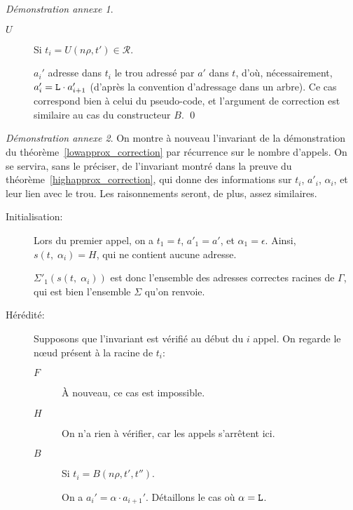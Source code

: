 \documentclass[11pt,a4paper]{article}
\theoremstyle{plain}
\theoremstyle{definition}
\theoremstyle{remark}
\newtheorem{demonstrationappendix}{Démonstration annexe}
\newcommand*{\sequent}{\Gamma}
\newcommand*{\Left}{\textnormal{\texttt{L}}}
\newcommand*{\representations}{\ensuremath{\mathcal{R}}}
\newcommand*{\highapproxspec}{\ensuremath{\Sigma'_1}}
\newcommand*{\treesimplify}{\ensuremath{s}}
\begin{document}
\begin{demonstrationappendix}
\begin{description}
\begin{description}
            \item[$U$] Si $t_i = U(n\rho, t') \in \representations$.
    
            $a_i'$ adresse dans $t_i$ le trou adressé par $a'$ dans $t$, d'où, nécessairement, $a_i' = \Left \cdot a_{i+1}'$ (d'après la convention d'adressage dans un arbre). Ce cas correspond bien à celui du pseudo-code, et l'argument de correction est similaire au cas du constructeur $B$.
\qed
        \end{description}
    \end{description}
\end{demonstrationappendix}

\begin{demonstrationappendix}
    \label{lowapprox_correction_proof}
    On montre à nouveau l'invariant de la démonstration du théorème~\ref{lowapprox_correction} par récurrence sur le nombre d'appels. On se servira, sans le préciser, de l'invariant montré dans la preuve du théorème~\ref{highapprox_correction}, qui donne des informations sur $t_i$, $a'_i$, $\alpha_i$, et leur lien avec le trou. Les raisonnements seront, de plus, assez similaires.

    \begin{description}
        \item[Initialisation:] Lors du premier appel, on a $t_1 = t$, $a'_1 = a'$, et $\alpha_1 = \epsilon$. Ainsi, $\treesimplify( t, \; {\alpha}_i ) = H$, qui ne contient aucune adresse.
        
        $\highapproxspec \left( \treesimplify( t, \; {\alpha}_i ) \right)$ est donc l'ensemble des adresses correctes racines de $\sequent$, qui est bien l'ensemble $\Sigma$ qu'on renvoie.

        \item[Hérédité:] Supposons que l'invariant est vérifié au début du $i$\ieme{} appel. On regarde le n\oe ud présent à la racine de $t_i$:

        \begin{description}
            \item[$F$]
                À nouveau, ce cas est impossible.
                
            \item[$H$]
                On n'a rien à vérifier, car les appels s'arrêtent ici. 

            \item[$B$] Si $t_i = B(n\rho, t', t'')$.

            On a $a_i' = \alpha \cdot a_{i+1}'$. Détaillons le cas où $\alpha = \Left$.


\end{description}
\end{description}
\end{demonstrationappendix}
\end{document}
